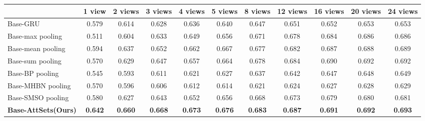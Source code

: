 \documentclass[twocolumn]{svjour3}    \pdfoutput=1
\newcommand{\nickname}{AttSets}
\begin{document}
\begin{table*}[t]
\caption{Group 3: mean IoU for multi-view reconstruction of all 13 categories in ShapeNet testing split. All networks are firstly trained given only 1 image for each object in Stage 1. The \nickname{} module is further trained given \textbf{16 images} per object in Stage 2, while other competing approaches are fine-tuned given \textbf{16 images} per object in Stage 2.}
\centering
\label{tab:iou_r2n2_16v}
\tabcolsep=0.125cm
\begin{tabular}{ l|cccccccccc}
\hline
&1 view&2 views&3 views& 4 views&5 views&8 views&12 views&16 views&20 views&24 views \\
\hline
Base-GRU &0.579&0.614&0.628&0.636&0.640&0.647&0.651&0.652&0.653&0.653 \\
Base-max pooling &0.511&0.604&0.633&0.649&0.656&0.671&0.678&0.684&0.686&0.686 \\
Base-mean pooling &0.594&0.637&0.652&0.662&0.667&0.677&0.682&0.687&0.688&0.689 \\
Base-sum pooling &0.570&0.629&0.647&0.657&0.664&0.678&0.684&0.690&0.692&0.692 \\
Base-BP pooling &0.545&0.593&0.611&0.621&0.627&0.637&0.642&0.647&0.648&0.649 \\
Base-MHBN pooling &0.570&0.596&0.606&0.612&0.614&0.621&0.624&0.627&0.628&0.629 \\
Base-SMSO pooling &0.580&0.627&0.643&0.652&0.656&0.668&0.673&0.679&0.680&0.681 \\
\textbf{Base-\nickname{}(Ours)} &\textbf{0.642}&\textbf{0.660}&\textbf{0.668}&\textbf{0.673}&\textbf{0.676}&\textbf{0.683}
&\textbf{0.687}&\textbf{0.691}&\textbf{0.692}&\textbf{0.693} \\
\hline
\end{tabular}
\vspace{-0.1 cm}
\end{table*}
\end{document}
